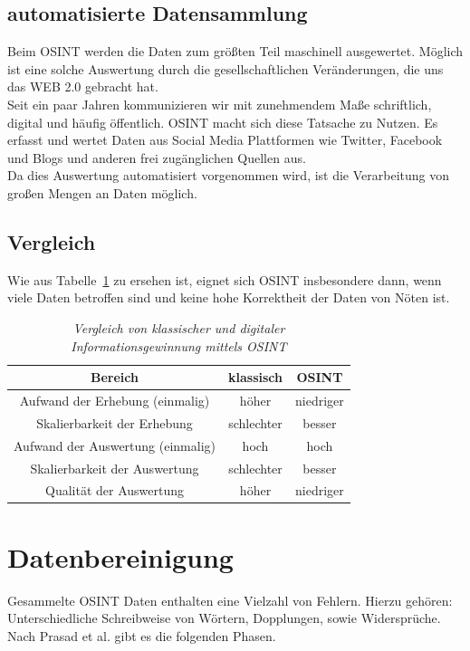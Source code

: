 \documentclass[twoside,a4paper]{article}
\begin{document}
\subsection{automatisierte Datensammlung}
Beim OSINT werden die Daten zum größten Teil maschinell ausgewertet. Möglich ist eine solche Auswertung durch die gesellschaftlichen Veränderungen, die uns das WEB 2.0 gebracht hat. \\
Seit ein paar Jahren kommunizieren wir mit zunehmendem Maße schriftlich, digital und häufig öffentlich. 
OSINT macht sich diese Tatsache zu Nutzen. Es erfasst und wertet Daten aus Social Media Plattformen wie Twitter, Facebook und Blogs und anderen frei zugänglichen Quellen aus.\\
Da dies Auswertung automatisiert vorgenommen wird, ist die Verarbeitung von großen Mengen an Daten möglich.
 
\subsection{Vergleich}
Wie aus Tabelle~\ref{tab:Vergleich} zu ersehen ist, eignet sich OSINT insbesondere dann, wenn viele Daten betroffen sind und keine hohe Korrektheit der Daten von Nöten ist.

\begin{table}[htdp]
  \caption{\it Vergleich von klassischer und digitaler Informationsgewinnung mittels OSINT}
  \begin{center}
    \begin{tabular}{|c|c|c|}\hline
      Bereich & klassisch & OSINT \\\hline
      Aufwand der Erhebung (einmalig)	& höher & niedriger\\
      Skalierbarkeit der Erhebung 		& schlechter & besser\\
      Aufwand der Auswertung (einmalig) 	& hoch & hoch\\
	  Skalierbarkeit der Auswertung 		& schlechter & besser\\
	  Qualität der Auswertung 			& höher & niedriger\\	  
     \hline
    \end{tabular}
  \end{center}
  \label{tab:Vergleich}
\end{table}


\section{Datenbereinigung}
Gesammelte OSINT Daten enthalten eine Vielzahl von Fehlern. Hierzu gehören: Unterschiedliche Schreibweise von Wörtern, Dopplungen, sowie Widersprüche. Nach Prasad et al.\cite{data_consolidation_solution} gibt es die folgenden Phasen.
\end{document}
